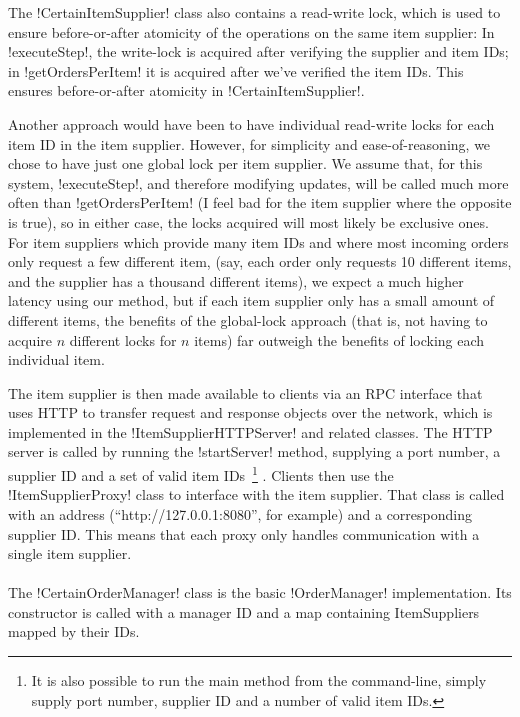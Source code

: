 \documentclass[a4paper, 12pt]{article}
\begin{document}
The !CertainItemSupplier! class also contains a read-write lock, which
is used to ensure before-or-after atomicity of the operations on the
same item supplier: In !executeStep!, the write-lock is acquired after
verifying the supplier and item IDs; in !getOrdersPerItem! it is
acquired after we've verified the item IDs. This ensures
before-or-after atomicity in !CertainItemSupplier!.

Another approach would have been to have individual read-write locks
for each item ID in the item supplier. However, for simplicity and
ease-of-reasoning, we chose to have just one global lock per item
supplier. We assume that, for this system, !executeStep!, and
therefore modifying updates, will be called much more often than
!getOrdersPerItem! (I feel bad for the item supplier where the
opposite is true), so in either case, the locks acquired will most
likely be exclusive ones. For item suppliers which provide many item
IDs and where most incoming orders only request a few different item,
(say, each order only requests 10 different items, and the supplier
has a thousand different items), we expect a much higher latency using
our method, but if each item supplier only has a small amount of
different items, the benefits of the global-lock approach (that is,
not having to acquire $n$ different locks for $n$ items) far outweigh
the benefits of locking each individual item.

The item supplier is then made available to clients via an RPC
interface that uses HTTP to transfer request and response objects over
the network, which is implemented in the !ItemSupplierHTTPServer! and
related classes. The HTTP server is called by running the
!startServer! method, supplying a port number, a supplier ID and a set
of valid item IDs~\footnote{It is also possible to run the main method
  from the command-line, simply supply port number, supplier ID and a
  number of valid item IDs. } . Clients then use the
!ItemSupplierProxy! class to interface with the item supplier. That
class is called with an address (``http://127.0.0.1:8080'', for
example) and a corresponding supplier ID. This means that each proxy
only handles communication with a single item supplier.

\paragraph{}

The !CertainOrderManager! class is the basic !OrderManager!
implementation. Its constructor is called with a manager ID and a map
containing ItemSuppliers mapped by their IDs.
\end{document}
